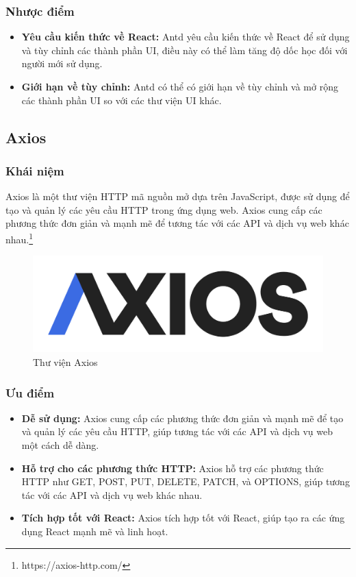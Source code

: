 \subsubsection{Nhược điểm}
\begin{itemize}
  \item \textbf{Yêu cầu kiến thức về React:} Antd yêu cầu kiến thức về React để sử dụng và tùy chỉnh các thành phần UI, điều này có thể làm tăng độ dốc học đối với người mới sử dụng.
  \item \textbf{Giới hạn về tùy chỉnh:} Antd có thể có giới hạn về tùy chỉnh và mở rộng các thành phần UI so với các thư viện UI khác.
\end{itemize}
\subsection{Axios}
\subsubsection{Khái niệm}
\noindent Axios là một thư viện HTTP mã nguồn mở dựa trên JavaScript, được sử dụng để tạo và quản lý các yêu cầu HTTP trong ứng dụng web. Axios cung cấp các phương thức đơn giản và mạnh mẽ để tương tác với các API và dịch vụ web khác nhau.\footnote{https://axios-http.com/}
\begin{figure}[H]
  \begin{center}
    \includegraphics[scale=0.2]{images/hieu/phuluc/axios.png}
    \caption{Thư viện Axios}
  \end{center}
\end{figure}
\subsubsection{Ưu điểm}
\begin{itemize}
  \item \textbf{Dễ sử dụng:} Axios cung cấp các phương thức đơn giản và mạnh mẽ để tạo và quản lý các yêu cầu HTTP, giúp tương tác với các API và dịch vụ web một cách dễ dàng.
  \item \textbf{Hỗ trợ cho các phương thức HTTP:} Axios hỗ trợ các phương thức HTTP như GET, POST, PUT, DELETE, PATCH, và OPTIONS, giúp tương tác với các API và dịch vụ web khác nhau.
  \item \textbf{Tích hợp tốt với React:} Axios tích hợp tốt với React, giúp tạo ra các ứng dụng React mạnh mẽ và linh hoạt.
\end{itemize}
